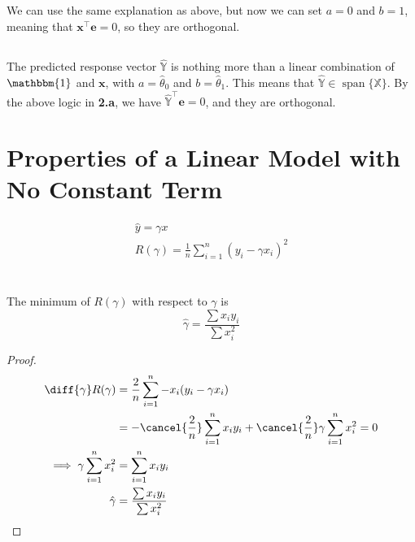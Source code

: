 \documentclass{article}
\newcommand{\X}{\mathbb{X}}
\newcommand{\Y}{\mathbb{Y}}
\newcommand{\One}{\mathbbm{1}}
\DeclareMathOperator{\Span}{span}
\begin{document}
\subsection{}

We can use the same explanation as above, but now we can set \(a = 0\) and \(b = 1\), meaning that \(\bm{x}^\top \bm{e} = 0\), so they are orthogonal.

\subsection{}

The predicted response vector \(\hat{\Y}\) is nothing more than a linear combination of \(\One\) and \(\bm{x}\), with \(a = \hat{\theta}_0\) and \(b = \hat{\theta}_1\).
This means that \(\hat{\Y} \in \Span\{\X\}\).
By the above logic in \textbf{2.a}, we have \(\hat{\Y}^\top \bm{e} = 0\), and they are orthogonal.

\section*{Properties of a Linear Model with No Constant Term}

\begin{gather}
    \hat{y} = \gamma x \\
    R(\gamma) = \frac{1}{n} \sum_{i = 1}^n (y_i - \gamma x_i)^2
\end{gather}

\section{}

\begin{theorem}
    The minimum of \(R(\gamma)\) with respect to \(\gamma\) is
    \begin{equation}
        \hat{\gamma} = \frac{\sum x_i y_i}{\sum x_i^2}
    \end{equation}
\end{theorem}
\begin{proof}
    \begin{align}
        \diff{\gamma} R(\gamma) &= \frac{2}{n} \sum_{i = 1}^n -x_i (y_i - \gamma x_i) \\
        &= -\cancel{\frac{2}{n}} \sum_{i = 1}^n x_i y_i + \cancel{\frac{2}{n}} \gamma \sum_{i = 1}^n x_i^2 = 0 \\
        \implies \gamma \sum_{i = 1}^n x_i^2 &= \sum_{i = 1}^n x_i y_i \\
        \hat{\gamma} &= \frac{\sum x_i y_i}{\sum x_i^2}
    \end{align}
\end{proof}
\end{document}
